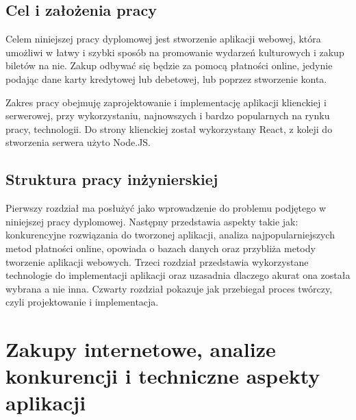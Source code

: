 \documentclass[12pt]{article}
\begin{document}
\begin{sloppypar}
{  \subsection{Cel i założenia pracy}
  {
    Celem niniejszej pracy dyplomowej jest stworzenie aplikacji webowej, która umożliwi w łatwy i szybki
    sposób na promowanie wydarzeń kulturowych i zakup biletów na nie. Zakup odbywać się będzie za pomocą
    płatności online, jedynie podając dane karty kredytowej lub debetowej, lub poprzez stworzenie konta.\par
    Zakres pracy obejmuję zaprojektowanie i implementację aplikacji klienckiej i serwerowej, przy
    wykorzystaniu, najnowszych i bardzo popularnych na rynku pracy, technologii. Do strony klienckiej
    został wykorzystany React, z koleji do stworzenia serwera użyto Node.JS.
  }
  \subsection{Struktura pracy inżynierskiej}
  {
    Pierwszy rozdział ma posłużyć jako wprowadzenie do problemu podjętego w niniejszej pracy dyplomowej.
    Następny przedstawia aspekty takie jak: konkurencyjne rozwiązania do tworzonej aplikacji,
    analiza najpopularniejszych metod płatności online, opowiada o bazach danych oraz przybliża
    metody tworzenie aplikacji webowych.
    Trzeci rozdział przedstawia wykorzystane technologie do implementacji aplikacji oraz uzasadnia dlaczego
    akurat ona została wybrana a nie inna.
    Czwarty rozdział pokazuje jak przebiegał proces twórczy, czyli projektowanie i implementacja.
  }
}

\section{Zakupy internetowe, analize konkurencji i techniczne aspekty aplikacji}
{
}
\end{sloppypar}
\end{document}
